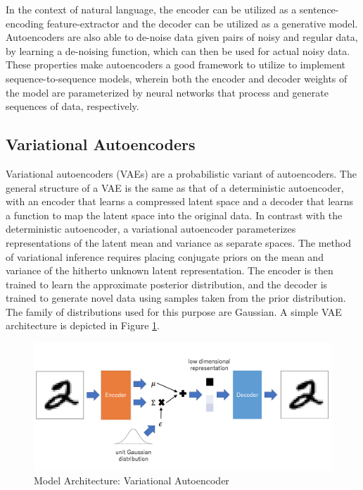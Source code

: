 In the context of natural language, the encoder can be utilized as a sentence-encoding feature-extractor and the decoder can be utilized as a generative model. Autoencoders are also able to de-noise data given pairs of noisy and regular data, by learning a de-noising function, which can then be used for actual noisy data. These properties make autoencoders a good framework to utilize to implement sequence-to-sequence models, wherein both the encoder and decoder weights of the model are parameterized by neural networks that process and generate sequences of data, respectively.

\subsection{Variational Autoencoders}

Variational autoencoders (VAEs) \citep{kingma2013auto} are a probabilistic variant of autoencoders. The general structure of a VAE is the same as that of a deterministic autoencoder, with an encoder that learns a compressed latent space and a decoder that learns a function to map the latent space into the original data. In contrast with the deterministic autoencoder, a variational autoencoder parameterizes representations of the latent mean and variance as separate spaces. The method of variational inference requires placing conjugate priors on the mean and variance of the hitherto unknown latent representation. The encoder is then trained to learn the approximate posterior distribution, and the decoder is trained to generate novel data using samples taken from the prior distribution. The family of distributions used for this purpose are Gaussian. A simple VAE architecture is depicted in Figure \ref{fig:vae-structure}.

\begin{figure}[ht]
	\centering
	\includegraphics[width=\textwidth]{images/vae-structure}
	\caption{\label{fig:vae-structure} Model Architecture: Variational Autoencoder}
\end{figure}


